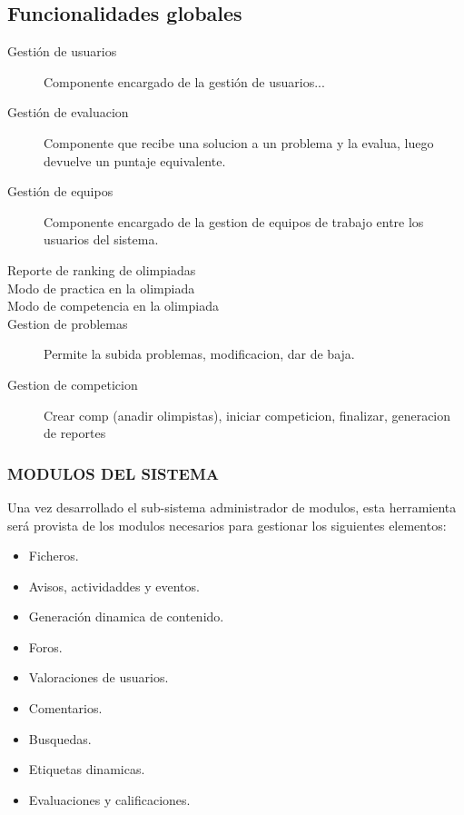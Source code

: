 \subsection{Funcionalidades globales}
\begin{description}
    \item[Gestión de usuarios]
    Componente encargado de la gestión de usuarios...
    \item[Gestión de evaluacion]
    Componente que recibe una solucion a un problema y la evalua, luego devuelve un puntaje equivalente.
    \item[Gestión de equipos] %
    Componente encargado de la gestion de equipos de trabajo entre los
    usuarios del sistema.
    \item[]
    \item[]
    \item[Reporte de ranking de olimpiadas]
    \item[Modo de practica en la olimpiada]
    \item[Modo de competencia en la olimpiada]
    \item[Gestion de problemas]
    Permite la subida problemas, modificacion, dar de baja.
    \item[Gestion de competicion]
    Crear comp (anadir olimpistas), iniciar competicion, finalizar, generacion de reportes
\end{description}

\subsubsection{MODULOS DEL SISTEMA}
Una vez desarrollado el sub-sistema administrador de modulos, esta
herramienta será provista de los modulos necesarios para gestionar
los siguientes elementos:
\begin{itemize}
    \item Ficheros.
    \item Avisos, actividaddes y eventos.
    \item Generación dinamica de contenido.
    \item Foros.
    \item Valoraciones de usuarios.
    \item Comentarios.
    \item Busquedas.
    \item Etiquetas dinamicas.
    \item Evaluaciones y calificaciones.
\end{itemize}

